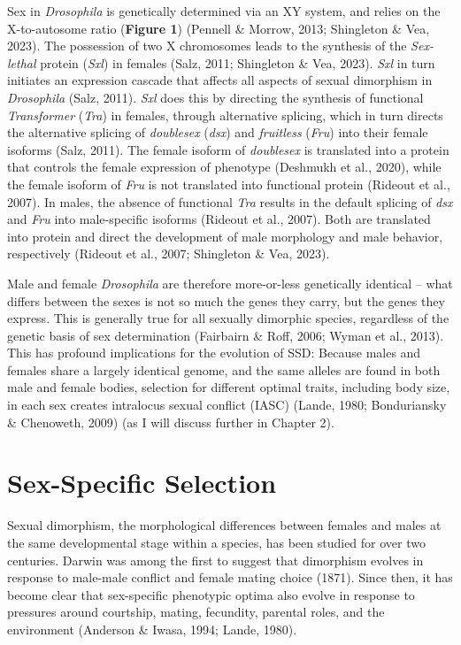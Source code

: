 \documentclass[12pt,reqno,oneside]{report}
\begin{document}
Sex in \textit{Drosophila} is genetically determined via an XY system, and relies on the X-to-autosome ratio (\textbf{Figure 1}) (Pennell \& Morrow, 2013; Shingleton \& Vea, 2023). The possession of two X chromosomes leads to the synthesis of the \textit{Sex-lethal} protein (\textit{Sxl}) in females  (Salz, 2011; Shingleton \& Vea, 2023). \textit{Sxl} in turn initiates an expression cascade that affects all aspects of sexual dimorphism in \textit{Drosophila} (Salz, 2011). \textit{Sxl} does this by directing the synthesis of functional \textit{Transformer} (\textit{Tra}) in females, through alternative splicing, which in turn directs the alternative splicing of \textit{doublesex} (\textit{dsx}) and \textit{fruitless} (\textit{Fru}) into their female isoforms (Salz, 2011). The female isoform of \textit{doublesex} is translated into a protein that controls the female expression of phenotype (Deshmukh et al., 2020), while the female isoform of \textit{Fru} is not translated into functional protein (Rideout et al., 2007). In males, the absence of functional \textit{Tra} results in the default splicing of \textit{dsx} and \textit{Fru} into male-specific isoforms (Rideout et al., 2007). Both are translated into protein and direct the development of male morphology and male behavior, respectively (Rideout et al., 2007; Shingleton \& Vea, 2023).

Male and female \textit{Drosophila} are therefore more-or-less genetically identical -- what differs between the sexes is not so much the genes they carry, but the genes they express. This is generally true for all sexually dimorphic species, regardless of the genetic basis of sex determination (Fairbairn \& Roff, 2006; Wyman et al., 2013). This has profound implications for the evolution of SSD: Because males and females share a largely identical genome, and the same alleles are found in both male and female bodies, selection for different optimal traits, including body size, in each sex creates intralocus sexual conflict (IASC) (Lande, 1980; Bonduriansky \& Chenoweth, 2009) (as I will discuss further in Chapter 2).

\section{Sex-Specific Selection}

Sexual dimorphism, the morphological differences between females and males at the same developmental stage within a species, has been studied for over two centuries. Darwin was among the first to suggest that dimorphism evolves in response to male-male conflict and female mating choice (1871). Since then, it has become clear that sex-specific phenotypic optima also evolve in response to pressures around courtship, mating, fecundity, parental roles, and the environment (Anderson \& Iwasa, 1994; Lande, 1980).
\end{document}
